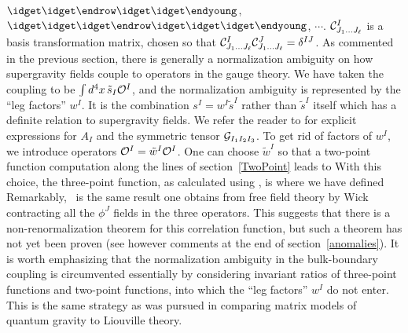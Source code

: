 $\oalign{\idget\idget\endrow\idget\idget\endyoung}$,
$\oalign{\idget\idget\idget\endrow\idget\idget\idget\endyoung}$, $\cdots$.
${\cal C}^I_{J_1 \ldots J_\ell}$ is a basis transformation matrix, chosen
so that ${\cal C}^I_{J_1 \ldots J_\ell} {\cal C}^J_{J_1 \ldots J_\ell} =
\delta^{IJ}$.  As commented in the previous section, there is generally a
normalization ambiguity on how supergravity fields couple to operators in
the gauge theory.  We have taken the coupling to be $\int d^4x \,
\tilde{s}_I {\cal O}^I$, and the normalization ambiguity is represented by
the ``leg factors'' $w^I$.  It is the combination $s^I = w^I \tilde{s}^I$
rather than $\tilde{s}^I$ itself which has a definite relation to
supergravity fields.  We refer the reader to \cite{Lee:1998bx} for explicit
expressions for $A_I$ and the symmetric tensor ${\cal G}_{I_1 I_2 I_3}$.
To get rid of factors of $w^I$, we introduce operators ${\cal O}^I =
\tilde{w}^I {\cal O}^I$.  One can choose $\tilde{w}^I$ so that a two-point
function computation along the lines of section~\ref{TwoPoint} leads to
 With this choice, the three-point function, as calculated using
\ThreeGraph, is 
 where we have defined
 Remarkably, \ThreePointO\ is the same result one obtains from free field
theory by Wick contracting all the $\phi^J$ fields in the three operators.
This suggests that there is a non-renormalization theorem for this
correlation function, but such a theorem has not yet been proven (see however
comments at the end of section~\ref{anomalies}). It
is worth emphasizing that the normalization ambiguity in the bulk-boundary
coupling is circumvented essentially by considering invariant ratios of
three-point functions and two-point functions, into which the ``leg
factors'' $w^I$ do not enter.  This is the same strategy as was pursued in
comparing matrix models of quantum gravity to Liouville
theory.
 


